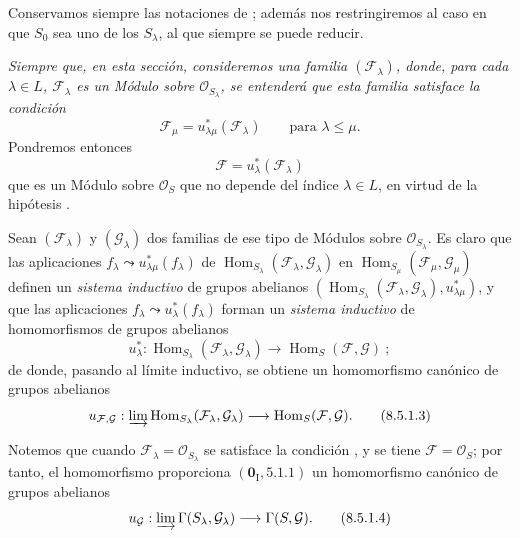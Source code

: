 \begin{env}[8.5.1]
\label{IV.8.5.1-fr}
Conservamos siempre las notaciones de ; además nos restringiremos al caso en que $S_0$ sea uno de los $S_\lambda$, al que siempre se puede reducir.

\emph{Siempre que, en esta sección, consideremos una familia $(\mathcal F_\lambda)$, donde, para cada $\lambda\in L$, $\mathcal F_\lambda$ es un Módulo sobre $\mathcal O_{S_\lambda}$, se entenderá que esta familia satisface la condición}
\begin{equation}
  \mathcal F_\mu=u_{\lambda\mu}^*(\mathcal F_\lambda)
  \qquad\text{para }\lambda\leq\mu.
  \tag{8.5.1.1}\label{IV.8.5.1.1-fr}
\end{equation}
Pondremos entonces
\begin{equation}
  \mathcal F=u_\lambda^*(\mathcal F_\lambda)
  \tag{8.5.1.2}\label{IV.8.5.1.2-fr}
\end{equation}
que es un Módulo sobre $\mathcal O_S$ que no depende del índice $\lambda\in L$, en virtud de la hipótesis .

Sean $(\mathcal F_\lambda)$ y $(\mathcal G_\lambda)$ dos familias de ese tipo de Módulos sobre $\mathcal O_{S_\lambda}$.
Es claro que las aplicaciones $f_\lambda\leadsto u_{\lambda\mu}^*(f_\lambda)$ de $\operatorname{Hom}_{S_\lambda}(\mathcal F_\lambda,\mathcal G_\lambda)$ en $\operatorname{Hom}_{S_\mu}(\mathcal F_\mu,\mathcal G_\mu)$ definen un \emph{sistema inductivo} de grupos abelianos $(\operatorname{Hom}_{S_\lambda}(\mathcal F_\lambda,\mathcal G_\lambda),
u_{\lambda\mu}^*)$, y que las aplicaciones $f_\lambda\leadsto u_\lambda^*(f_\lambda)$ forman un \emph{sistema inductivo} de homomorfismos de grupos abelianos
\[
  u_\lambda^*:\operatorname{Hom}_{S_\lambda}
  (\mathcal F_\lambda,\mathcal G_\lambda)
  \longrightarrow\operatorname{Hom}_S(\mathcal F,\mathcal G)~;
\]
de donde, pasando al límite inductivo, se obtiene un homomorfismo canónico de grupos abelianos
\begin{equation}
  u_{\mathcal F,\mathcal G}:
  \varinjlim\operatorname{Hom}_{S_\lambda}
  (\mathcal F_\lambda,\mathcal G_\lambda)
  \longrightarrow\operatorname{Hom}_S(\mathcal F,\mathcal G).
  \tag{8.5.1.3}\label{IV.8.5.1.3-fr}
\end{equation}

Notemos que cuando $\mathcal F_\lambda=\mathcal O_{S_\lambda}$ se satisface la condición , y se tiene $\mathcal F=\mathcal O_S$; por tanto, el homomorfismo  proporciona $(\mathbf{0}_{\mathrm I},5.1.1)$ un homomorfismo canónico de grupos abelianos
\begin{equation}
  u_{\mathcal G}:\varinjlim\Gamma(S_\lambda,\mathcal G_\lambda)
  \longrightarrow\Gamma(S,\mathcal G).
  \tag{8.5.1.4}\label{IV.8.5.1.4-fr}
\end{equation}
\end{env}

